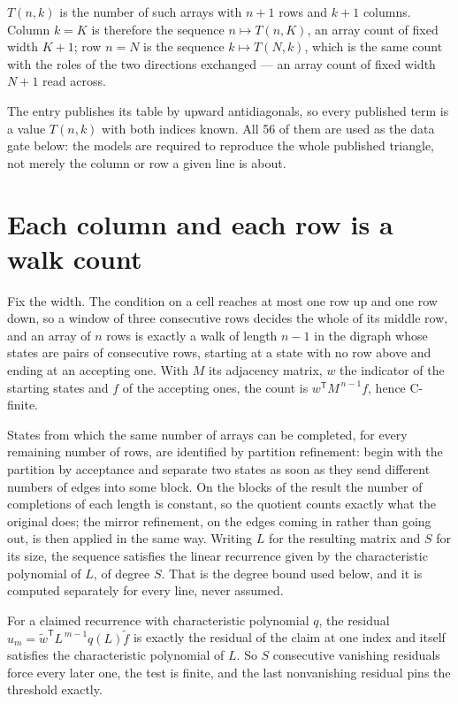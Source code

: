 \documentclass[11pt]{article}
\theoremstyle{definition}
\begin{document}
$T(n,k)$ is the number of such arrays with $n + 1$ rows and $k + 1$ columns. Column $k = K$ is therefore the sequence $n \mapsto T(n,K)$, an array count of fixed width $K + 1$; row $n = N$ is the sequence $k \mapsto T(N,k)$, which is the same count with the roles of the two directions exchanged --- an array count of fixed width $N + 1$ read across.

The entry publishes its table by upward antidiagonals, so every published term is a value $T(n,k)$ with both indices known. All 56 of them are used as the data gate below: the models are required to reproduce the whole published triangle, not merely the column or row a given line is about.

\section{Each column and each row is a walk count}

Fix the width. The condition on a cell reaches at most one row up and one row down, so a window of three consecutive rows decides the whole of its middle row, and an array of $n$ rows is exactly a walk of length $n-1$ in the digraph whose states are pairs of consecutive rows, starting at a state with no row above and ending at an accepting one. With $M$ its adjacency matrix, $w$ the indicator of the starting states and $f$ of the accepting ones, the count is $w^{\mathsf T}M^{\,n-1}f$, hence C-finite.

States from which the same number of arrays can be completed, for every remaining number of rows, are identified by partition refinement: begin with the partition by acceptance and separate two states as soon as they send different numbers of edges into some block. On the blocks of the result the number of completions of each length is constant, so the quotient counts exactly what the original does; the mirror refinement, on the edges coming in rather than going out, is then applied in the same way. Writing $L$ for the resulting matrix and $S$ for its size, the sequence satisfies the linear recurrence given by the characteristic polynomial of $L$, of degree $S$. That is the degree bound used below, and it is computed separately for every line, never assumed.

For a claimed recurrence with characteristic polynomial $q$, the residual $u_m = \tilde w^{\mathsf T}L^{\,m-1}q(L)\tilde f$ is exactly the residual of the claim at one index and itself satisfies the characteristic polynomial of $L$. So $S$ consecutive vanishing residuals force every later one, the test is finite, and the last nonvanishing residual pins the threshold exactly.
\end{document}
